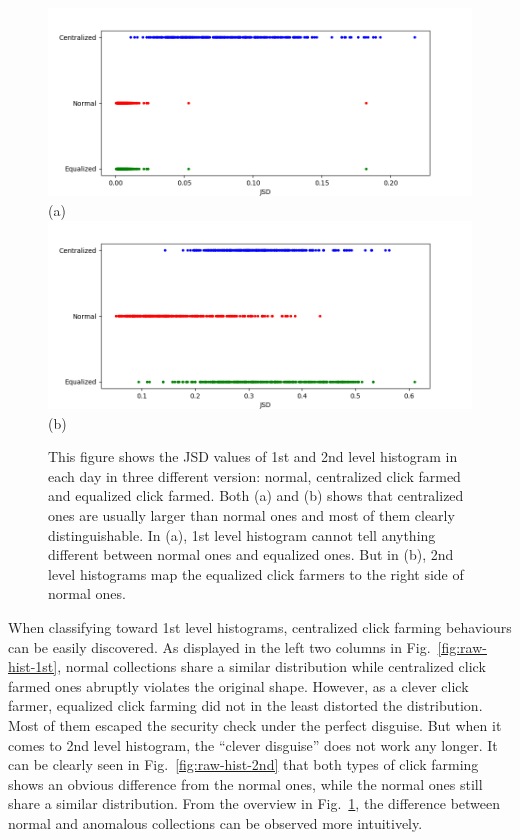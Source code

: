 \documentclass[a4paper]{IEEEtran}
\begin{document}
			\begin{figure}[!ht]
				\centering
				\includegraphics[width=\linewidth]{fig/RawOverview1st.png}
				(a)
				\includegraphics[width=\linewidth]{fig/RawOverview2nd.png}
				(b)
				\caption{This figure shows the JSD values of 1st and 2nd level histogram in each day in three different version: normal, centralized click farmed and equalized click farmed. Both (a) and (b) shows that centralized ones are usually larger than normal ones and most of them clearly distinguishable. In (a), 1st level histogram cannot tell anything different between normal ones and equalized ones. But in (b), 2nd level histograms map the equalized click farmers to the right side of normal ones.}
				\label{fig:raw-overview}
			\end{figure}
			
			When classifying toward 1st level histograms, centralized click farming behaviours can be easily discovered. As displayed in the left two columns in Fig.~\ref{fig:raw-hist-1st}, normal collections share a similar distribution while centralized click farmed ones abruptly violates the original shape. However, as a clever click farmer, equalized click farming did not in the least distorted the distribution. Most of them escaped the security check under the perfect disguise.
			But when it comes to 2nd level histogram, the ``clever disguise'' does not work any longer. It can be clearly seen in Fig.~\ref{fig:raw-hist-2nd} that both types of click farming shows an obvious difference from the normal ones, while the normal ones still share a similar distribution.
			From the overview in Fig.~\ref{fig:raw-overview}, the difference between normal and anomalous collections can be observed more intuitively.
			
\end{document}
